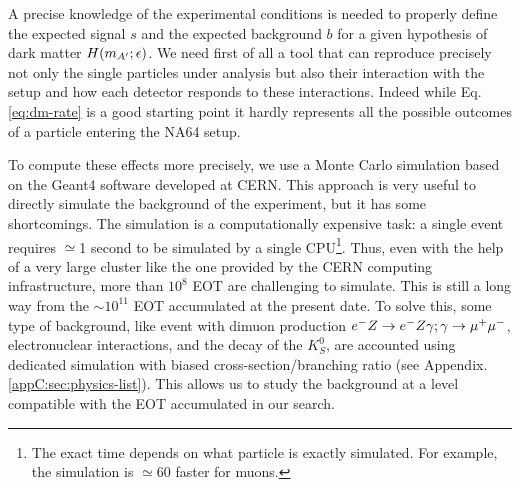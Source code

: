 A precise knowledge of the experimental conditions is needed to properly define the expected signal $s$ and the expected background $b$ for a given hypothesis of dark matter $H(m_{A'};\epsilon)$. We need first of all a tool that can reproduce precisely not only the single particles under analysis but also their interaction with the setup and how each detector responds to these interactions. Indeed while Eq.\ref{eq:dm-rate} is a good starting point it hardly represents all the possible outcomes of a particle entering the NA64 setup.

To compute these effects more precisely, we use a Monte Carlo simulation based on the Geant4 software \cite{AGOSTINELLI2003250,1610988} developed at CERN. This approach is very useful to directly simulate the background of the experiment, but it has some shortcomings. The simulation is a computationally expensive task: a single event requires $\simeq$1 second to be simulated by a single CPU\footnote{The exact time depends on what particle is exactly simulated. For example, the simulation is $\simeq$60 faster for muons.}. Thus, even with the help of a very large cluster like the one provided by the CERN computing infrastructure, more than $10^8$ EOT are challenging to simulate. This is still a long way from the $\sim 10^{11}$ EOT accumulated at the present date. To solve this, some type of background, like event with dimuon production $e^- Z \to e^- Z \gamma; \gamma \to \mu^+ \mu^-$, electronuclear interactions, and the decay of the $K^0_S$, are accounted using dedicated simulation with biased cross-section/branching ratio (see Appendix.\ref{appC:sec:physics-list}). This allows us to study the background at a level compatible with the EOT accumulated in our search.

